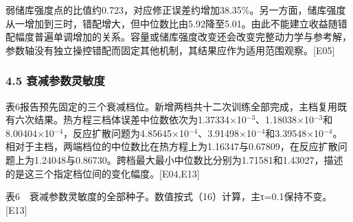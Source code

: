 \documentclass[11pt,a4paper]{article}
\begin{document}
弱储库强度点的比值约0.723，对应修正误差约增加38.35\%。另一方面，储库强度从一增加到三时，错配增大，但中位数比由5.92降至5.01。由此不能建立收益随错配幅度普遍单调增加的关系。容量或储库强度改变还会改变完整动力学与参考解，参数轴没有独立操控错配而固定其他机制，其结果应作为适用范围观察。{[}E05{]}

\subsubsection{4.5 衰减参数灵敏度}\label{ux8870ux51cfux53c2ux6570ux7075ux654fux5ea6}

表6报告预先固定的三个衰减档位。新增两档共十二次训练全部完成，主档复用既有六次结果。热方程三档体误差中位数依次为1.37334×10\ensuremath{^{-3}}、1.18038×10\ensuremath{^{-3}}和8.00404×10\ensuremath{^{-4}}，反应扩散问题为4.85645×10\ensuremath{^{-4}}、3.91498×10\ensuremath{^{-4}}和3.39548×10\ensuremath{^{-4}}。相对于主档，两端档位的中位数比在热方程上为1.16347与0.67809，在反应扩散问题上为1.24048与0.86730。跨档最大最小中位数比分别为1.71581和1.43027，描述的是这三个指定档位间的变化幅度。{[}E04,E13{]}

表6　衰减参数灵敏度的全部种子。数值按式（16）计算，主τ=0.1保持不变。{[}E13{]}
\end{document}
